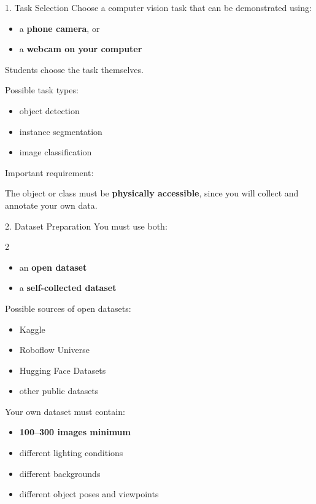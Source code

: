 \documentclass[aspectratio=169]{beamer}
\begin{document}
\begin{frame}[t]{1. Task Selection}
    \vspace*{-0.4cm}
Choose a computer vision task that can be demonstrated using:

\begin{itemize}
\item a \textbf{phone camera}, or
\item a \textbf{webcam on your computer}
\end{itemize}

Students choose the task themselves.

Possible task types:
\begin{itemize}
\item object detection
\item instance segmentation
\item image classification
\end{itemize}

Important requirement:

The object or class must be \textbf{physically accessible}, since you will
collect and annotate your own data.
\end{frame}


\begin{frame}[t]{2. Dataset Preparation}
    \vspace*{-0.4cm}
You must use both:
\begin{multicols}{2}
\begin{itemize}
\item an \textbf{open dataset}
\item a \textbf{self-collected dataset}
\end{itemize}

Possible sources of open datasets:
\begin{itemize}
\item Kaggle
\item Roboflow Universe
\item Hugging Face Datasets
\item other public datasets
\end{itemize}

Your own dataset must contain:

\begin{itemize}
\item \textbf{100--300 images minimum}
\item different lighting conditions
\item different backgrounds
\item different object poses and viewpoints
\end{itemize}
\end{multicols}

\end{frame}
\end{document}
